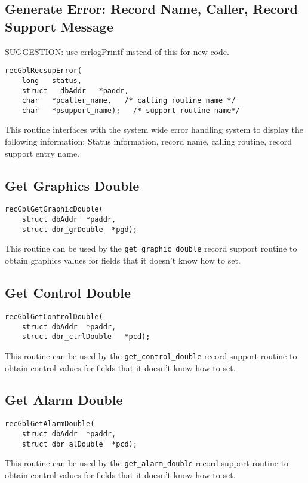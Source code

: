 \subsection{Generate Error: Record Name, Caller, Record Support Message}
SUGGESTION: use errlogPrintf instead of this for new code.
\begin{verbatim}
recGblRecsupError(
    long   status,
    struct   dbAddr   *paddr,
    char   *pcaller_name,   /* calling routine name */
    char   *psupport_name);   /* support routine name*/
\end{verbatim}
This routine interfaces with the system wide error handling system to display the following information: Status 
information, record name, calling routine, record support entry name.

\subsection{Get Graphics Double}

\begin{verbatim}
recGblGetGraphicDouble(
    struct dbAddr  *paddr,
    struct dbr_grDouble  *pgd);
\end{verbatim}This routine can be used by the \verb|get_graphic_double| record support routine to obtain graphics values for fields that 
it doesn't know how to set.

\subsection{Get Control Double}

\begin{verbatim}
recGblGetControlDouble(
    struct dbAddr  *paddr,
    struct dbr_ctrlDouble   *pcd);
\end{verbatim}This routine can be used by the \verb|get_control_double| record support routine to obtain control values for fields that it 
doesn't know how to set.

\subsection{Get Alarm Double}

\begin{verbatim}
recGblGetAlarmDouble(
    struct dbAddr  *paddr,
    struct dbr_alDouble  *pcd);
\end{verbatim}This routine can be used by the \verb|get_alarm_double| record support routine to obtain control values for fields that it 
doesn't know how to set.


